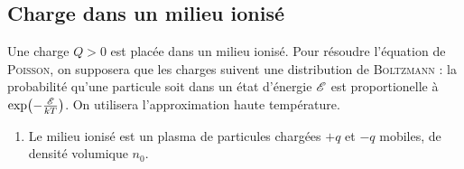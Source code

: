 \documentclass[a4paper,french,bookmarks]{book}
\begin{document}
    \subsection{Charge dans un milieu ionisé}
    
    Une charge $Q > 0$ est placée dans un milieu ionisé. Pour résoudre l'équation de \textsc{Poisson}, on supposera que les charges suivent une distribution de \textsc{Boltzmann} : la probabilité qu'une particule soit dans un état d'énergie $\mathscr{E}$ est proportionelle à $\exp{-\frac{\bsE}{kT}}$. On utilisera l'approximation haute température.
    
    \begin{enumerate}
        \item Le milieu ionisé est un plasma de particules chargées $+q$ et $-q$ mobiles, de densité volumique $n_0$.
        
        

\end{enumerate}
\end{document}
